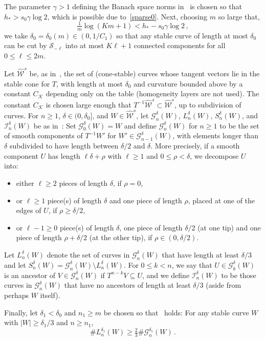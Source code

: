 \documentclass[AHL,Unicode,longabstracts,published]{cedram}
\newcommand{\cG}{\mathcal{G}}
\newcommand{\cI}{\mathcal{I}}
\newcommand{\cK}{\mathcal{K}}
\newcommand{\cS}{\mathcal{S}}
\newcommand{\cW}{\mathcal{W}}
\newcommand{\hW}{\widehat{\cW}}
\begin{document}
The parameter $\gamma >1$ defining the Banach space norms in~\cite{Ca} is chosen so that $h_* > s_0 \gamma \log 2$, which is possible due to~\eqref{sparse0}. Next, choosing $m$ so large that,
\[
\tfrac 1m \log (Km+1) < h_* - s_0 \gamma \log 2 \,,
\]
we take $\delta_0 = \delta_0(m) \in (0,1/C_1)$ so that any stable curve of length at most $\delta_0$ can be cut by $\cS_{-\ell}$ into at most $K\ell+1$ connected components for all $0 \le \ell \le 2m$.


Let $\hW^s$ be, as in~\cite[\S~5]{BD1}, the set of (cone-stable) curves whose tangent vectors lie in the stable cone for $T$, with length at most $\delta_0$ and curvature bounded above by a constant $C_{\cK}$ depending only on the table (homogeneity layers are not used). The constant $C_{\cK}$ is chosen large enough that $T^{-1} \hW^s \subset \hW^s$, up to subdivision of curves. For $n\ge 1$, $\delta \in (0,\delta_0]$, and $W\in \hW^s$, let $\cG_{n}^{ \delta}(W)$, $L_{n}^{ \delta}(W)$, $S_{n}^{ \delta}(W)$, and $\cI_n^\delta(W)$ be as in~\cite[\S~5]{BD1}: Set $\cG^\delta_0(W) = W$ and define $\cG_n^\delta(W)$ for $n\ge 1$ to be the set of smooth components of $T^{-1}W'$ for $W' \in \cG^\delta_{n-1}(W)$, with elements longer than $\delta$ subdivided to have length between $\delta/2$ and $\delta$. More precisely, if a smooth component $U$ has length $\ell \delta + \rho$ with $\ell \ge 1$ and $0 \le \rho<\delta$, we decompose $U$ into:
\begin{itemize}
\item either $\ell\ge 2$ pieces of length $\delta$, if $\rho=0$,
\item or $\ell\ge 1$ piece(s) of length $\delta$ and one piece of length $\rho$, placed at one of the edges of $U$, if $\rho\ge\delta/2$,
\item or $\ell-1\ge 0$ piece(s) of length $\delta$, one piece of length $\delta/2$ (at one tip) and one piece of length $\rho+\delta/2$ (at the other tip), if $\rho\in (0, \delta/2)$.
\end{itemize}

Let $L_n^{\delta}(W)$ denote the set of curves in $\cG_n^{\delta}(W)$ that have length at least $\delta/3$ and let $S_n^\delta(W) = \cG_n^\delta(W) \setminus L_n^\delta(W)$. For $0\le k<n$, we say that $U \in \cG_k^\delta(W)$ is an ancestor of $V \in \cG_n^\delta(W)$ if $T^{n-k}V \subseteq U$, and we define $\cI_n^\delta(W)$ to be those curves in $\cG_n^\delta(W)$ that have no ancestors of length at least $\delta/3$ (aside from perhaps $W$ itself).

Finally, let $\delta_1< \delta_0$ and $n_1 \ge m$ be chosen so that~\cite[eq.~(5.6)]{BD1} holds: For any stable curve $W$ with $|W| \ge \delta_1/3$ and $n \ge n_1$,
\begin{equation}\label{defn1}
\# L_n^{\delta_1}(W) \ge \tfrac 23 \# \cG_n^{\delta_1}(W) \,.
\end{equation}
\end{document}
